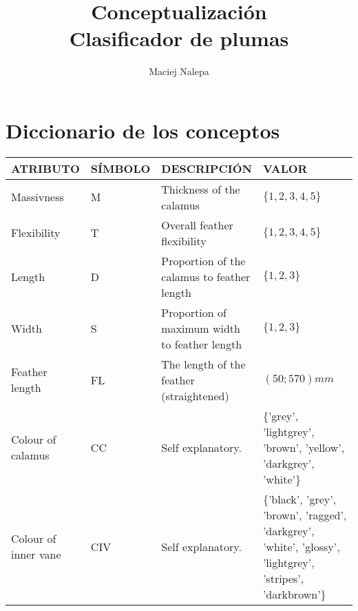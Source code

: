 \documentclass[a4paper,12pt]{article}
\title{Conceptualización\\ \normalsize{Clasificador de plumas}}
\author{Maciej Nalepa}
\begin{document}
\maketitle

\section{Diccionario de los conceptos}
\begin{table}[H]
	\centering
	\begin{tabular}{|p{0.2\linewidth}|p{0.15\linewidth}|p{0.25\linewidth}|p{0.4\linewidth}|}
		\hline
		ATRIBUTO                 & SÍMBOLO & DESCRIPCIÓN                                   & VALOR                                                                                                                                  \\ \hline\hline
		Massivness               & M       & Thickness of the calamus                      & $\{1,2,3,4,5\}$                                                                                                                        \\ \hline
		Flexibility              & T       & Overall feather flexibility                   & $\{1,2,3,4,5\}$                                                                                                                        \\ \hline
		Length                   & D       & Proportion of the calamus to feather length   & $\{1,2,3\}$                                                                                                                            \\ \hline
		Width                    & S       & Proportion of maximum width to feather length & $\{1,2,3\}$                                                                                                                            \\ \hline
		Feather length           & FL      & The length of the feather (straightened)      & $(50;570) mm$                                                                                                                          \\ \hline
		Colour of calamus        & CC      & Self explanatory.                             & \{'grey', 'lightgrey', 'brown', 'yellow', 'darkgrey', 'white'\}                                                                        \\ \hline
		Colour of inner vane     & CIV     & Self explanatory.                             & \{'black', 'grey', 'brown', 'ragged', 'darkgrey', 'white', 'glossy', 'lightgrey', 'stripes', 'darkbrown'\}                             \\ \hline

\end{tabular}
\end{table}
\end{document}
